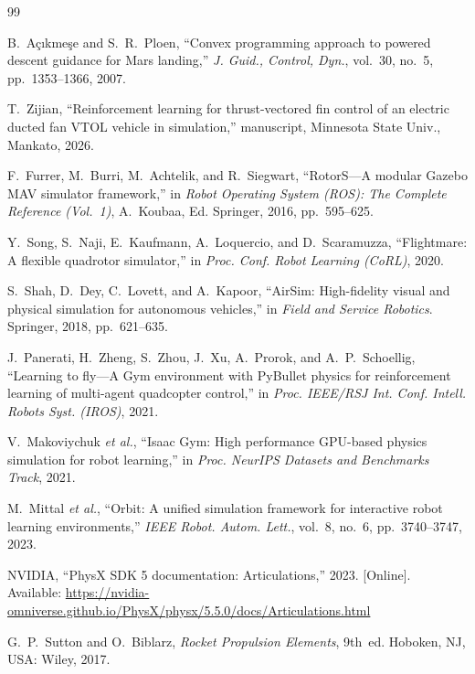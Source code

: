 \documentclass[journal]{IEEEtran}
\begin{document}
\begin{thebibliography}{99}

B.~A\c{c}{\i}kme\c{s}e and S.~R.~Ploen, ``Convex programming approach to powered descent guidance for Mars landing,'' \textit{J. Guid., Control, Dyn.}, vol.~30, no.~5, pp.~1353--1366, 2007.

T.~Zijian, ``Reinforcement learning for thrust-vectored fin control of an electric ducted fan VTOL vehicle in simulation,'' manuscript, Minnesota State Univ., Mankato, 2026.

F.~Furrer, M.~Burri, M.~Achtelik, and R.~Siegwart, ``RotorS---A modular Gazebo MAV simulator framework,'' in \textit{Robot Operating System (ROS): The Complete Reference (Vol.~1)}, A.~Koubaa, Ed. Springer, 2016, pp.~595--625.

Y.~Song, S.~Naji, E.~Kaufmann, A.~Loquercio, and D.~Scaramuzza, ``Flightmare: A flexible quadrotor simulator,'' in \textit{Proc. Conf. Robot Learning (CoRL)}, 2020.

S.~Shah, D.~Dey, C.~Lovett, and A.~Kapoor, ``AirSim: High-fidelity visual and physical simulation for autonomous vehicles,'' in \textit{Field and Service Robotics}. Springer, 2018, pp.~621--635.

J.~Panerati, H.~Zheng, S.~Zhou, J.~Xu, A.~Prorok, and A.~P.~Schoellig, ``Learning to fly---A Gym environment with PyBullet physics for reinforcement learning of multi-agent quadcopter control,'' in \textit{Proc. IEEE/RSJ Int. Conf. Intell. Robots Syst. (IROS)}, 2021.

V.~Makoviychuk \textit{et al.}, ``Isaac Gym: High performance GPU-based physics simulation for robot learning,'' in \textit{Proc. NeurIPS Datasets and Benchmarks Track}, 2021.

M.~Mittal \textit{et al.}, ``Orbit: A unified simulation framework for interactive robot learning environments,'' \textit{IEEE Robot. Autom. Lett.}, vol.~8, no.~6, pp.~3740--3747, 2023.

NVIDIA, ``PhysX SDK 5 documentation: Articulations,'' 2023. [Online]. Available: \url{https://nvidia-omniverse.github.io/PhysX/physx/5.5.0/docs/Articulations.html}

G.~P.~Sutton and O.~Biblarz, \textit{Rocket Propulsion Elements}, 9th~ed. Hoboken, NJ, USA: Wiley, 2017.


\end{thebibliography}
\end{document}
